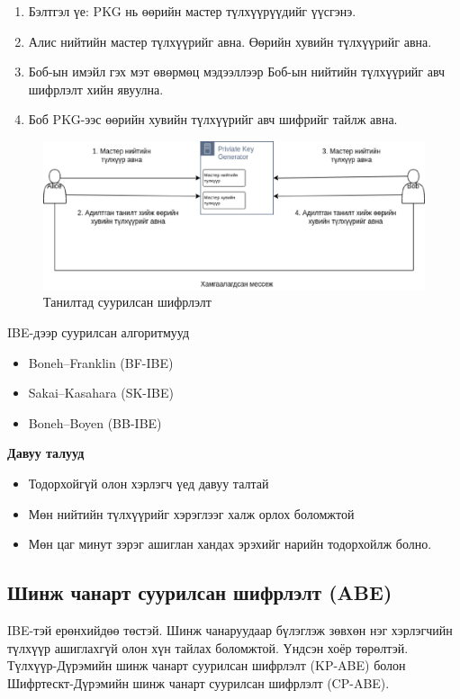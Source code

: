 \begin{enumerate}
    \item Бэлтгэл үе: PKG нь өөрийн мастер түлхүүрүүдийг үүсгэнэ.
    \item Алис нийтийн мастер түлхүүрийг авна. Өөрийн хувийн түлхүүрийг авна.
    \item Боб-ын имэйл гэх мэт өвөрмөц мэдээллээр Боб-ын нийтийн түлхүүрийг авч шифрлэлт хийн явуулна.
    \item Боб PKG-ээс өөрийн хувийн түлхүүрийг авч шифрийг тайлж авна.
\end{enumerate}

\begin{figure}[ht]
    \centering
    \includegraphics[scale=0.6]{Figures/encryption_schemes/IBE.eps}
    \caption{Танилтад суурилсан шифрлэлт}
    \label{fig:IBE}
\end{figure}

IBE-дээр суурилсан алгоритмууд

\begin{itemize}
    \item Boneh–Franklin (BF-IBE)
    \item Sakai–Kasahara (SK-IBE)
    \item Boneh–Boyen (BB-IBE)
\end{itemize}

\textbf{Давуу талууд}
\begin{itemize}
    \item Тодорхойгүй олон хэрлэгч үед давуу талтай
    \item Мөн нийтийн түлхүүрийг хэрэглээг халж орлох боломжтой
    \item Мөн цаг минут зэрэг ашиглан хандах эрэхийг нарийн тодорхойлж болно.
\end{itemize}
\subsection*{Шинж чанарт суурилсан шифрлэлт (ABE)}
IBE-тэй ерөнхийдөө төстэй. Шинж чанаруудаар бүлэглэж зөвхөн нэг хэрлэгчийн түлхүүр ашиглахгүй олон хүн тайлах боломжтой.
Үндсэн хоёр төрөлтэй. Түлхүүр-Дүрэмийн шинж чанарт суурилсан шифрлэлт (KP-ABE) болон Шифртескт-Дүрэмийн шинж чанарт суурилсан шифрлэлт (CP-ABE).\cite{WikiABE}

